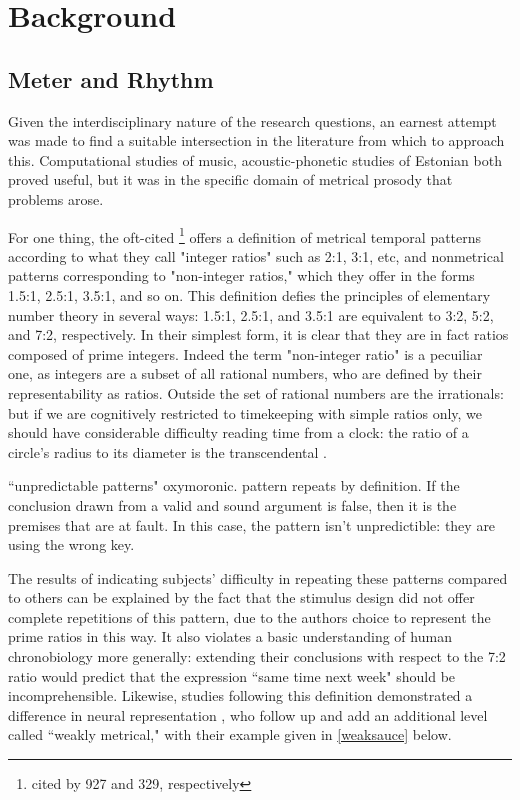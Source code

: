 \chapter{Background}

\section{Meter and Rhythm}

Given the interdisciplinary nature of the research questions, an earnest attempt was made to find a suitable intersection in the literature from which to approach this. Computational studies of music, acoustic-phonetic studies of Estonian both proved useful, but it was in the specific domain of metrical prosody that problems arose. 

For one thing, the oft-cited \citep{essensPovel1985}\footnote{cited by 927 and 329, respectively} offers a definition of metrical  temporal patterns according to what they call "integer ratios" such as 2:1, 3:1, etc, and nonmetrical patterns corresponding to "non-integer ratios," which they offer in the forms 1.5:1, 2.5:1, 3.5:1, and so on. This definition defies the principles of elementary number theory in several ways: 1.5:1, 2.5:1, and 3.5:1 are equivalent to 3:2, 5:2, and 7:2, respectively. In their simplest form, it is clear that they are in fact ratios composed of prime integers. Indeed the term "non-integer ratio" is a pecuiliar one, as integers are a subset of all rational numbers, who are defined by their representability as ratios. Outside the set of rational numbers are the irrationals: but if we are cognitively restricted to timekeeping with simple ratios only, we should have considerable difficulty reading time from a clock: the ratio of a circle's radius to its diameter is the transcendental \pi.  

``unpredictable patterns" oxymoronic. pattern repeats by definition. If the conclusion drawn from a valid and sound argument is false, then it is the premises that are at fault. In this case, the pattern isn't unpredictible: they are using the wrong key. 


The results of \citep{essensPovel1985} indicating subjects' difficulty in repeating these patterns compared to others can be explained by the fact that the stimulus design did not offer complete repetitions of this pattern, due to the authors choice to represent the prime ratios in this way. It also violates a basic understanding of human chronobiology more generally: extending their conclusions with respect to the 7:2 ratio would predict that the expression ``same time next week" should be incomprehensible. 
Likewise, studies following this definition demonstrated a difference in neural representation \citep{katsuyuki1999}, who follow up \citep{essensPovel1985} and add an additional level called ``weakly metrical," with their example given in \ref{weaksauce} below. 

